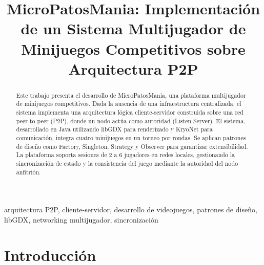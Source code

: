 \documentclass[conference]{IEEEtran}
\begin{document}
\makeatletter
\newcommand{\linebreakand}{%
    \end{@IEEEauthorhalign}
    \hfill\mbox{}\par
    \mbox{}\hfill\begin{@IEEEauthorhalign}
}
\makeatother

\title{MicroPatosMania: Implementación de un Sistema Multijugador de Minijuegos Competitivos sobre Arquitectura P2P}

\author{
    \and
}

\maketitle

\begin{abstract}
    Este trabajo presenta el desarrollo de MicroPatosMania, una plataforma multijugador de minijuegos competitivos. Dada la ausencia de una infraestructura centralizada, el sistema implementa una arquitectura lógica cliente-servidor construida sobre una red peer-to-peer (P2P), donde un nodo actúa como autoridad (Listen Server). El sistema, desarrollado en Java utilizando libGDX para renderizado y KryoNet para comunicación, integra cuatro minijuegos en un torneo por rondas. Se aplican patrones de diseño como Factory, Singleton, Strategy y Observer para garantizar extensibilidad. La plataforma soporta sesiones de 2 a 6 jugadores en redes locales, gestionando la sincronización de estado y la consistencia del juego mediante la autoridad del nodo anfitrión.
\end{abstract}

\begin{IEEEkeywords}
    arquitectura P2P, cliente-servidor, desarrollo de videojuegos, patrones de diseño, libGDX, networking multijugador, sincronización
\end{IEEEkeywords}

\section{Introducción}
\end{document}
